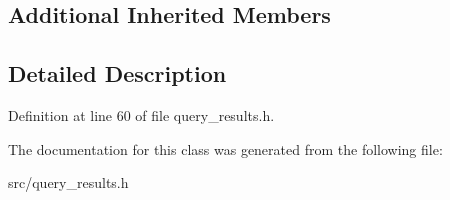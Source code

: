 \subsection*{Additional Inherited Members}


\subsection{Detailed Description}


Definition at line 60 of file query\+\_\+results.\+h.



The documentation for this class was generated from the following file\+:\begin{DoxyCompactItemize}
\item 
src/query\+\_\+results.\+h\end{DoxyCompactItemize}
